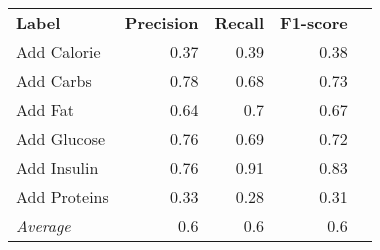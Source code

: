 \begin{tabular}{lrrrr}
    \textbf{Label} & \textbf{Precision} & \textbf{Recall} & \textbf{F1-score} \\
    Add Calorie & 0.37 & 0.39 & 0.38 \\
    Add Carbs & 0.78 & 0.68 & 0.73 \\
    Add Fat & 0.64 & 0.7 & 0.67 \\
    Add Glucose & 0.76 & 0.69 & 0.72 \\
    Add Insulin & 0.76 & 0.91 & 0.83 \\
    Add Proteins & 0.33 & 0.28 & 0.31 \\
    \emph{Average} & 0.6 & 0.6 & 0.6 \\
\end{tabular}